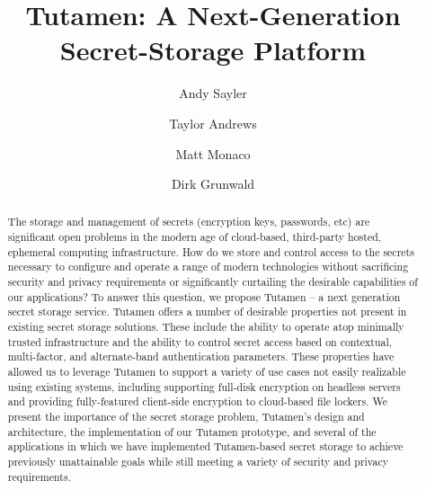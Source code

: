 \documentclass[10pt,twocolumn]{article}
\begin{document}
\title{Tutamen: A Next-Generation Secret-Storage Platform}

\author{Andy Sayler}
\author{Taylor Andrews}
\author{Matt Monaco}
\author{Dirk Grunwald}

\date{}

\maketitle

\begin{abstract}
The storage and management of secrets (encryption keys, passwords,
etc) are significant open problems in the modern age of cloud-based,
third-party hosted, ephemeral computing infrastructure. How do we
store and control access to the secrets necessary to configure and
operate a range of modern technologies without sacrificing security
and privacy requirements or significantly curtailing the desirable
capabilities of our applications? To answer this question, we propose
Tutamen -- a next generation secret storage service. Tutamen offers a
number of desirable properties not present in existing secret storage
solutions. These include the ability to operate atop minimally trusted
infrastructure and the ability to control secret access based on
contextual, multi-factor, and alternate-band authentication
parameters. These properties have allowed us to leverage Tutamen to
support a variety of use cases not easily realizable using existing
systems, including supporting full-disk encryption on headless servers
and providing fully-featured client-side encryption to cloud-based
file lockers. We present the importance of the secret storage problem,
Tutamen's design and architecture, the implementation of our Tutamen
prototype, and several of the applications in which we have
implemented Tutamen-based secret storage to achieve previously
unattainable goals while still meeting a variety of security and
privacy requirements.
\end{abstract}








{
  
  
}
\end{document}
